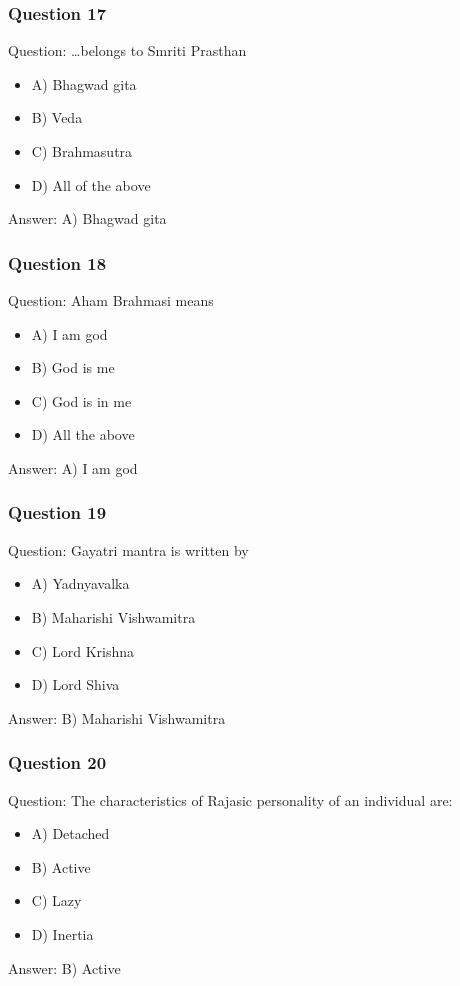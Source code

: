 \begin{frame}[fragile]\frametitle{Question 17}
Question: \ldots belongs to Smriti Prasthan
\begin{itemize}
\item A) Bhagwad gita
\item B) Veda
\item C) Brahmasutra
\item D) All of the above
\end{itemize}
Answer: A) Bhagwad gita
\end{frame}

\begin{frame}[fragile]\frametitle{Question 18}
Question: Aham Brahmasi means
\begin{itemize}
\item A) I am god
\item B) God is me
\item C) God is in me
\item D) All the above
\end{itemize}
Answer: A) I am god
\end{frame}

\begin{frame}[fragile]\frametitle{Question 19}
Question: Gayatri mantra is written by
\begin{itemize}
\item A) Yadnyavalka
\item B) Maharishi Vishwamitra
\item C) Lord Krishna
\item D) Lord Shiva
\end{itemize}
Answer: B) Maharishi Vishwamitra
\end{frame}

\begin{frame}[fragile]\frametitle{Question 20}
Question: The characteristics of Rajasic personality of an individual are:
\begin{itemize}
\item A) Detached
\item B) Active
\item C) Lazy
\item D) Inertia
\end{itemize}
Answer: B) Active
\end{frame}

